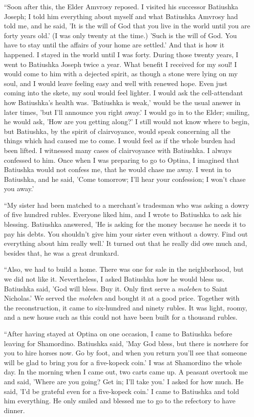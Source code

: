 “Soon after this, the Elder Amvrosy reposed. I visited his successor Batiushka Joseph; I told him everything about myself and what Batiushka Amvrosy had told me, and he said, 'It is the will of God that you live in the world until you are forty years old.' (I was only twenty at the time.) 'Such is the will of God. You have to stay until the affairs of your home are settled.' And that is how it happened. I stayed in the world until I was forty. During those twenty years, I went to Batiushka Joseph twice a year. What benefit I received for my soul! I would come to him with a dejected spirit, as though a stone were lying on my soul, and I would leave feeling easy and well with renewed hope. Even just coming into the skete, my soul would feel lighter. I would ask the cell-attendant how Batiushka's health was. 'Batiushka is weak,' would be the usual answer in later times, 'but I'll announce you right away.' I would go in to the Elder; smiling, he would ask, 'How are you getting along?' I still would not know where to begin, but Batiushka, by the spirit of clairvoyance, would speak concerning all the things which had caused me to come. I would feel as if the whole burden had been lifted. I witnessed many cases of clairvoyance with Batiushka. I always confessed to him. Once when I was preparing to go to Optina, I imagined that Batiushka would not confess me, that he would chase me away. I went in to Batiushka, and he said, 'Come tomorrow; I'll hear your confession; I won't chase you away.'

“My sister had been matched to a merchant's tradesman who was asking a dowry of five hundred rubles. Everyone liked him, and I wrote to Batiushka to ask his blessing. Batiushka answered, 'He is asking for the money because he needs it to pay his debts. You shouldn't give him your sister even without a dowry. Find out everything about him really well.' It turned out that he really did owe much and, besides that, he was a great drunkard.

“Also, we had to build a home. There was one for sale in the neighborhood, but we did not like it. Nevertheless, I asked Batiushka how he would bless us. Batiushka said, 'God will bless. Buy it. Only first serve a \textit{moleben} to Saint Nicholas.' We served the \textit{moleben} and bought it at a good price. Together with the reconstruction, it came to six-hundred and ninety rubles. It was light, roomy, and a new house such as this could not have been built for a thousand rubles.

“After having stayed at Optina on one occasion, I came to Batiushka before leaving for Shamordino. Batiushka said, 'May God bless, but there is nowhere for you to hire horses now. Go by foot, and when you return you'll see that someone will be glad to bring you for a five-kopeck coin.' I was at Shamordino the whole day. In the morning when I came out, two carts came up. A peasant overtook me and said, 'Where are you going? Get in; I'll take you.' I asked for how much. He said, 'I'd be grateful even for a five-kopeck coin.' I came to Batiushka and told him everything. He only smiled and blessed me to go to the refectory to have dinner.

